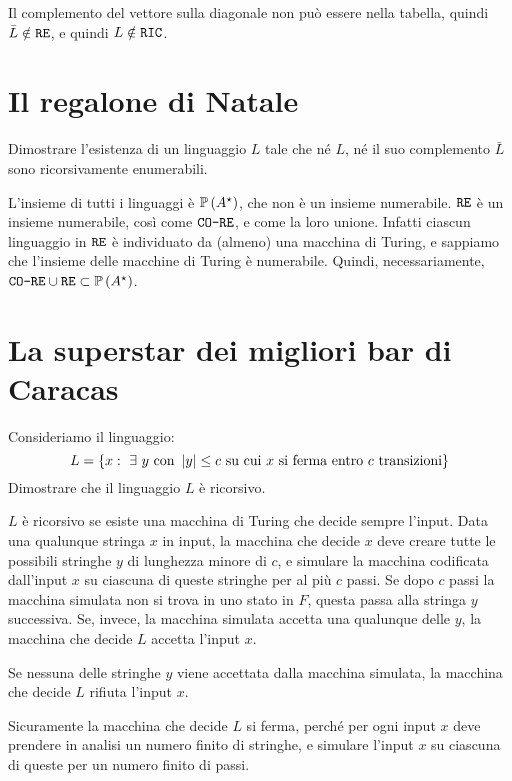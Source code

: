 Il complemento del vettore sulla diagonale non pu\`o essere nella tabella, quindi $\bar{L} \notin \texttt{RE}$, e quindi $L \notin \texttt{RIC}$.

\section{Il regalone di Natale}

\begin{esercizio}
Dimostrare l'esistenza di un linguaggio $L$ tale che n\'e $L$, n\'e il suo complemento $\bar{L}$ sono ricorsivamente enumerabili. 
\end{esercizio}

L'insieme di tutti i linguaggi \`e $\mathbb{P} \left( A^{\star} \right)$, che non \`e un insieme numerabile. $\texttt{RE}$ \`e un insieme numerabile, cos\`i come $\texttt{CO-RE}$, e come la loro unione. Infatti ciascun linguaggio in $\texttt{RE}$ \`e individuato da (almeno) una macchina di Turing, e sappiamo che l'insieme delle macchine di Turing \`e numerabile. Quindi, necessariamente, $\texttt{CO-RE} \cup \texttt{RE} \subset \mathbb{P} \left( A^{\star} \right)$.

\section{La superstar dei migliori bar di Caracas}

\begin{esercizio}
Consideriamo il linguaggio:
\[
L = \{ x : \exists y \text{ con } \abs{y} \le c \text{ su cui } x \text{ si ferma entro } c \text{ transizioni} \}
\]
Dimostrare che il linguaggio $L$ \`e ricorsivo.
\end{esercizio}

$L$ \`e ricorsivo se esiste una macchina di Turing che decide sempre l'input. Data una qualunque stringa $x$ in input, la macchina che decide $x$ deve creare tutte le possibili stringhe $y$ di lunghezza minore di $c$, e simulare la macchina codificata dall'input $x$ su ciascuna di queste stringhe per al pi\`u $c$ passi. Se dopo $c$ passi la macchina simulata non si trova in uno stato in $F$, questa passa alla stringa $y$ successiva. Se, invece, la macchina simulata accetta una qualunque delle $y$, la macchina che decide $L$ accetta l'input $x$.

Se nessuna delle stringhe $y$ viene accettata dalla macchina simulata, la macchina che decide $L$ rifiuta l'input $x$.

Sicuramente la macchina che decide $L$ si ferma, perch\'e per ogni input $x$ deve prendere in analisi un numero finito di stringhe, e simulare l'input $x$ su ciascuna di queste per un numero finito di passi.

